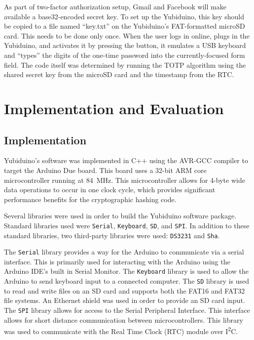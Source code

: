 \documentclass[conference]{IEEEtran}
\begin{document}
As part of two-factor authorization setup, Gmail and Facebook will make available a base32-encoded secret key. To set up the Yubiduino, this key should be copied to a file named ``key.txt'' on the Yubiduino's FAT-formatted microSD card. This needs to be done only once. When the user logs in online, plugs in the Yubiduino, and activates it by pressing the button, it emulates a USB keyboard and ``types'' the digits of the one-time password into the currently-focused form field. The code itself was determined by running the TOTP algorithm using the shared secret key from the microSD card and the timestamp from the RTC.

\section{Implementation and Evaluation}

\subsection{Implementation}


Yubiduino's software was implemented in C++ using the AVR-GCC compiler to
target the Arduino Due board.  This board uses a 32-bit ARM core microcontroller running at \SI{84}{\MHz}.  This microcontroller allows for 4-byte wide data
operations to occur in one clock cycle, which provides significant performance
benefits for the cryptographic hashing code.

Several libraries were used in order to build the Yubiduino software package.
Standard libraries used were \texttt{Serial}, \texttt{Keyboard}, \texttt{SD},
and \texttt{SPI}.  In addition to these standard libraries, two third-party
libraries were used: \texttt{DS3231} and \texttt{Sha}.

The \texttt{Serial} library provides a way for the Arduino to communicate via a
serial interface.  This is primarily used for interacting with the Arduino
using the Arduino IDE's built in Serial Monitor. The \texttt{Keyboard} library
is used to allow the Arduino to send keyboard input to a connected computer.
The \texttt{SD} library is used to read and write files on an SD card and
supports both the FAT16 and FAT32 file systems.  An Ethernet shield was used in
order to provide an SD card input. The \texttt{SPI} library allows for access
to the Serial Peripheral Interface.  This interface allows for short distance
communication between microcontrollers.  This library was used to communicate
with the Real Time Clock (RTC) module over I\textsuperscript{2}C.
\end{document}
